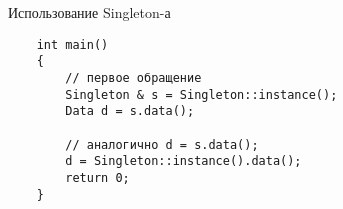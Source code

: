 \documentclass{beamer}
\begin{document}
\begin{frame}[fragile]{Использование Singleton-а}{}
\begin{lstlisting}
    int main()
    {
        // первое обращение
        Singleton & s = Singleton::instance();
        Data d = s.data();

        // аналогично d = s.data();
        d = Singleton::instance().data();
        return 0;    
    }
\end{lstlisting}
\end{frame}
\end{document}
